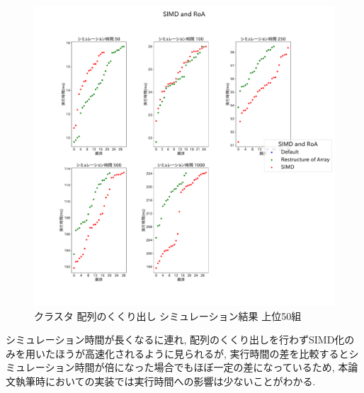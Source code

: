 \begin{figure}[htb]
\begin{center}
    \includegraphics[width=14cm]{./images/cluster-top50-SIMD-and-RoA.pdf}
    \caption{クラスタ 配列のくくり出し シミュレーション結果 上位50組}
    \label{fig:cluster-roa-top50}
\end{center}
\end{figure}

シミュレーション時間が長くなるに連れ,
配列のくくり出しを行わずSIMD化のみを用いたほうが高速化されるように見られるが,
実行時間の差を比較するとシミュレーション時間が倍になった場合でもほぼ一定の差になっているため,
本論文執筆時においての実装では実行時間への影響は少ないことがわかる.\\

